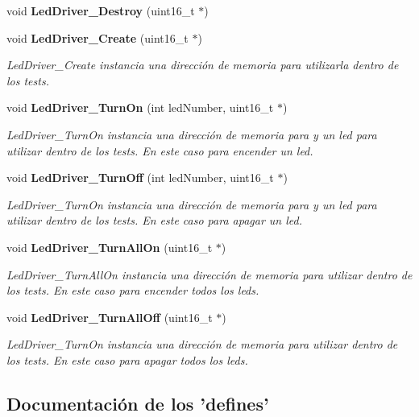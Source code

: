 \begin{DoxyCompactItemize}
\item 
void {\bf Led\-Driver\-\_\-\-Destroy} (uint16\-\_\-t $\ast$)
\item 
void {\bf Led\-Driver\-\_\-\-Create} (uint16\-\_\-t $\ast$)
\begin{DoxyCompactList}\small\item\em Led\-Driver\-\_\-\-Create instancia una dirección de memoria para utilizarla dentro de los tests. \end{DoxyCompactList}\item 
void {\bf Led\-Driver\-\_\-\-Turn\-On} (int led\-Number, uint16\-\_\-t $\ast$)
\begin{DoxyCompactList}\small\item\em Led\-Driver\-\_\-\-Turn\-On instancia una dirección de memoria para y un led para utilizar dentro de los tests. En este caso para encender un led. \end{DoxyCompactList}\item 
void {\bf Led\-Driver\-\_\-\-Turn\-Off} (int led\-Number, uint16\-\_\-t $\ast$)
\begin{DoxyCompactList}\small\item\em Led\-Driver\-\_\-\-Turn\-On instancia una dirección de memoria para y un led para utilizar dentro de los tests. En este caso para apagar un led. \end{DoxyCompactList}\item 
void {\bf Led\-Driver\-\_\-\-Turn\-All\-On} (uint16\-\_\-t $\ast$)
\begin{DoxyCompactList}\small\item\em Led\-Driver\-\_\-\-Turn\-All\-On instancia una dirección de memoria para utilizar dentro de los tests. En este caso para encender todos los leds. \end{DoxyCompactList}\item 
void {\bf Led\-Driver\-\_\-\-Turn\-All\-Off} (uint16\-\_\-t $\ast$)
\begin{DoxyCompactList}\small\item\em Led\-Driver\-\_\-\-Turn\-On instancia una dirección de memoria para utilizar dentro de los tests. En este caso para apagar todos los leds. \end{DoxyCompactList}\end{DoxyCompactItemize}


\subsection{Documentación de los 'defines'}
